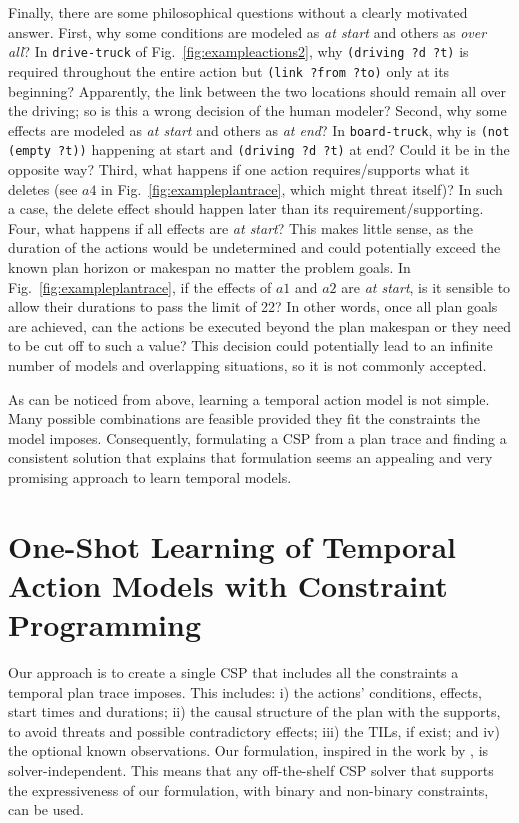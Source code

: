 \documentclass[runningheads]{llncs}
\begin{document}
Finally, there are some philosophical questions without a clearly motivated answer. First, why some conditions are modeled as \emph{at start} and others as \emph{over all}? In \texttt{drive-truck} of Fig.~\ref{fig:exampleactions2}, why \texttt{(driving ?d ?t)} is required throughout the entire action but \texttt{(link ?from ?to)} only at its beginning? Apparently, the link between the two locations should remain all over the driving; so is this a wrong decision of the human modeler?
Second, why some effects are modeled as \emph{at start} and others as \emph{at end}? In \texttt{board-truck}, why is \texttt{(not (empty ?t))} happening at start and \texttt{(driving ?d ?t)} at end? Could it be in the opposite way?
Third, what happens if one action requires/supports what it deletes (see $a4$ in Fig.~\ref{fig:exampleplantrace}, which might threat itself)? In such a case, the delete effect should happen later than its requirement/supporting.
Four, what happens if all effects are \emph{at start}? This makes little sense, as the duration of the actions would be undetermined and could potentially exceed the known plan horizon or makespan no matter the problem goals. In Fig.~\ref{fig:exampleplantrace}, if the effects of $a1$ and $a2$ are \emph{at start}, is it sensible to allow their durations to pass the limit of 22? In other words, once all plan goals are achieved, can the actions be executed beyond the plan makespan or they need to be cut off to such a value? This decision could potentially lead to an infinite number of models and overlapping situations, so it is not commonly accepted.

As can be noticed from above, learning a temporal action model is not simple. Many possible combinations are feasible provided they fit the constraints the model imposes. Consequently, formulating a CSP from a plan trace and finding a consistent solution that explains that formulation seems an appealing and very promising approach to learn temporal models.



\section{One-Shot Learning of Temporal Action Models with Constraint Programming}
\label{sec:CPformulation}

Our approach is to create a single CSP that includes all the constraints a temporal plan trace imposes. This includes: i) the actions' conditions, effects, start times and durations; ii) the causal structure of the plan with the supports, to avoid threats and possible contradictory effects; iii) the TILs, if exist; and iv) the optional known observations. Our formulation, inspired in the work by \cite{garrido2009constraint}, is solver-independent. This means that any off-the-shelf CSP solver that supports the expressiveness of our formulation, with binary and non-binary constraints, can be used.
\end{document}
